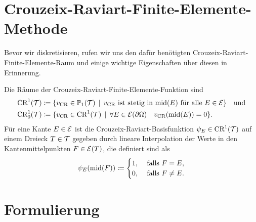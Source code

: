 \section{Crouzeix-Raviart-Finite-Elemente-Methode}
Bevor wir  diskretisieren, rufen wir uns den dafür
benötigten Crouzeix-Raviart-Finite-Elemente-Raum und einige wichtige
Eigenschaften über diesen in Erinnerung.

\begin{definition}
  Die Räume der Crouzeix-Raviart-Finite-Elemente-Funktion sind 
  \begin{align*}
    \textup{CR}^1(\mathcal{T})
    &\coloneqq
    \{v_\textup{CR}\in\mathbb{P}_1(\mathcal{T})\,\mid\, v_\textup{CR} \text{ ist stetig in }\textup{mid}(E)\text{ für
    alle } E\in\mathcal{E}\} \quad\text{und}\\
    \textup{CR}^1_0(\mathcal{T})
    &\coloneqq
    \{v_\textup{CR}\in\textup{CR}^1(\mathcal{T})\,\mid\, \forall E\in\mathcal{E}(\partial\Omega)\quad
    v_\textup{CR}(\textup{mid}(E))=0\}.
  \end{align*}
  Für eine Kante $E\in\mathcal{E}$ ist die Crouzeix-Raviart-Basisfunktion
  $\psi_E\in\textup{CR}^1(\mathcal{T})$ auf einem Dreieck $T\in\mathcal{T}$ gegeben durch lineare
  Interpolation der Werte in den Kantenmittelpunkten $F\in\mathcal{E}(T)$, die 
  definiert sind als
  \begin{align*}
    \psi_E(\textup{mid}(F))
    \coloneqq
    \begin{cases}
      1,&\text{ falls } F=E,\\
      0,&\text{ falls } F\neq E.
    \end{cases}
  \end{align*}
\end{definition}


\section{Formulierung}

